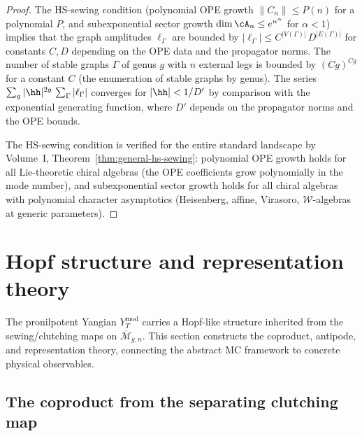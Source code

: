 \begin{proof}
The HS-sewing condition (polynomial OPE growth $\|C_n\| \le
P(n)$ for a polynomial $P$, and subexponential sector growth
$\dim \cA_n \le e^{n^\alpha}$ for $\alpha < 1$) implies that
the graph amplitudes $\ell_\Gamma$ are bounded by
$|\ell_\Gamma| \le C^{|V(\Gamma)|}\, D^{|E(\Gamma)|}$ for
constants $C, D$ depending on the OPE data and the propagator
norms. The number of stable graphs $\Gamma$ of genus $g$ with
$n$ external legs is bounded by $(Cg)^{Cg}$ for a constant $C$
(the enumeration of stable graphs by genus). The series
$\sum_g |\hh|^{2g}\, \sum_\Gamma |\ell_\Gamma|$ converges for
$|\hh| < 1/D'$ by comparison with the exponential generating
function, where $D'$ depends on the propagator norms and the
OPE bounds.

The HS-sewing condition is verified for the entire standard
landscape by Volume~I, Theorem~\ref*{thm:general-hs-sewing}:
polynomial OPE growth holds for all Lie-theoretic chiral algebras
(the OPE coefficients grow polynomially in the mode number),
and subexponential sector growth holds for all chiral algebras
with polynomial character asymptotics (Heisenberg, affine, Virasoro,
$\mathcal{W}$-algebras at generic parameters).
\end{proof}



\section{Hopf structure and representation theory}

The pronilpotent Yangian $Y_T^{\mathrm{mod}}$ carries a Hopf-like
structure inherited from the sewing/clutching maps on
$\overline{\mathcal{M}}_{g,n}$. This section constructs the
coproduct, antipode, and representation theory, connecting the
abstract MC framework to concrete physical observables.

\subsection{The coproduct from the separating clutching map}

